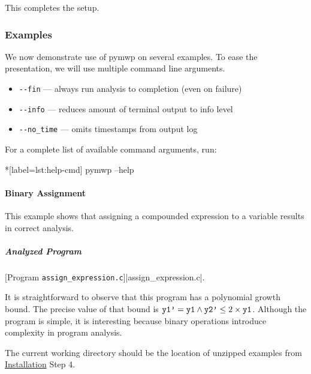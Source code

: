 This completes the setup.

\subsubsection{Examples}\label{guide-examples}

We now demonstrate use of pymwp on several examples.
To ease the presentation, we will use multiple command line arguments.

\begin{itemize}
\item \texttt{-\/-fin} --- always run analysis to completion (even on failure)
\item \texttt{-\/-info} --- reduces amount of terminal output to info level
\item \texttt{-\/-no\_time} --- omits timestamps from output log
\end{itemize}

For a complete list of available command arguments, run:

\begin{cmdlisting}*[label={lst:help-cmd}]
pymwp --help
\end{cmdlisting}

\paragraph{Binary Assignment}\label{binary-assignment}
This example shows that assigning a compounded expression to a variable results in correct analysis.

\subparagraph*{Analyzed Program}

\begin{center}
\begin{minipage}{\textwidth}
[Program \texttt{assign\_expression.c}]{\pr|assign\_expression.c|.}
\label{lst:assgn_exp}
\end{minipage}
\end{center}

It is straightforward to observe that this program has a polynomial growth bound.
The precise value of that bound is \(\prm{y1'} = \prm{y1} \land \prm{y2'} \leq 2 \times \prm{y1}\).
Although the program is simple, it is interesting because binary operations introduce complexity in program analysis.

The current working directory should be the location of unzipped examples from \hyperref[guide-install]{Installation} Step 4.

